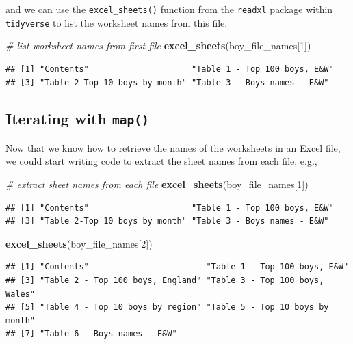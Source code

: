 \documentclass[
]{book}
\newenvironment{Shaded}{\begin{snugshade}}{\end{snugshade}}
\newcommand{\CommentTok}[1]{\textcolor[rgb]{0.56,0.35,0.01}{\textit{#1}}}
\newcommand{\DecValTok}[1]{\textcolor[rgb]{0.00,0.00,0.81}{#1}}
\newcommand{\KeywordTok}[1]{\textcolor[rgb]{0.13,0.29,0.53}{\textbf{#1}}}
\newcommand{\NormalTok}[1]{#1}
\begin{document}
and we can use the \texttt{excel\_sheets()} function from the \texttt{readxl} package within \texttt{tidyverse} to list the worksheet names from this file.

\begin{Shaded}
\begin{Highlighting}[]
\CommentTok{\# list worksheet names from first file}
\KeywordTok{excel\_sheets}\NormalTok{(boy\_file\_names[}\DecValTok{1}\NormalTok{])}
\end{Highlighting}
\end{Shaded}

\begin{verbatim}
## [1] "Contents"                     "Table 1 - Top 100 boys, E&W" 
## [3] "Table 2-Top 10 boys by month" "Table 3 - Boys names - E&W"
\end{verbatim}

\hypertarget{iterating-with-map}{%
\subsection{\texorpdfstring{Iterating with \texttt{map()}}{Iterating with map()}}\label{iterating-with-map}}

Now that we know how to retrieve the names of the worksheets in an Excel file, we could start writing code to extract the sheet names from each file, e.g.,

\begin{Shaded}
\begin{Highlighting}[]
\CommentTok{\# extract sheet names from each file}
\KeywordTok{excel\_sheets}\NormalTok{(boy\_file\_names[}\DecValTok{1}\NormalTok{])}
\end{Highlighting}
\end{Shaded}

\begin{verbatim}
## [1] "Contents"                     "Table 1 - Top 100 boys, E&W" 
## [3] "Table 2-Top 10 boys by month" "Table 3 - Boys names - E&W"
\end{verbatim}

\begin{Shaded}
\begin{Highlighting}[]
\KeywordTok{excel\_sheets}\NormalTok{(boy\_file\_names[}\DecValTok{2}\NormalTok{])}
\end{Highlighting}
\end{Shaded}

\begin{verbatim}
## [1] "Contents"                        "Table 1 - Top 100 boys, E&W"    
## [3] "Table 2 - Top 100 boys, England" "Table 3 - Top 100 boys, Wales"  
## [5] "Table 4 - Top 10 boys by region" "Table 5 - Top 10 boys by month" 
## [7] "Table 6 - Boys names - E&W"
\end{verbatim}
\end{document}
